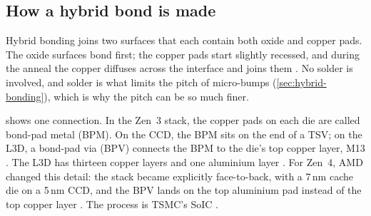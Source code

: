 \subsection{How a hybrid bond is made}
\label{sec:bond-process}
Hybrid bonding joins two surfaces that each contain both oxide and copper pads. The oxide surfaces bond first; the copper pads start slightly recessed, and during the anneal the copper diffuses across the interface and joins them \cite[slide~9]{alam2ndGeneration3D2024}. No solder is involved, and solder is what limits the pitch of micro-bumps (\cref{sec:hybrid-bonding}), which is why the pitch can be so much finer.

 shows one connection. In the Zen~3 stack, the copper pads on each die are called bond-pad metal (BPM). On the CCD, the BPM sits on the end of a TSV; on the L3D, a bond-pad via (BPV) connects the BPM to the die's top copper layer, M13 \cite[slide~16]{wuu2022vcache}. The L3D has thirteen copper layers and one aluminium layer \cite[slide~11]{wuu2022vcache}. For Zen~4, AMD changed this detail: the stack became explicitly face-to-back, with a 7\,nm cache die on a 5\,nm CCD, and the BPV lands on the top aluminium pad instead of the top copper layer \cite[slides~11--12]{alam2ndGeneration3D2024}. The process is TSMC's SoIC \cite[slide~16]{wuu2022vcache}.

